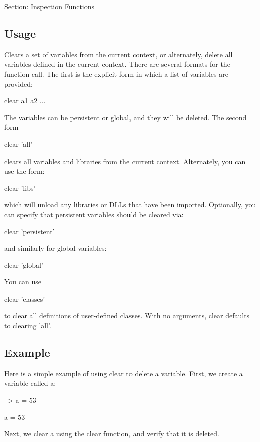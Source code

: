 Section\-: \hyperlink{sec_inspection}{Inspection Functions} \hypertarget{vtkwidgets_vtkxyplotwidget_Usage}{}\subsection{Usage}\label{vtkwidgets_vtkxyplotwidget_Usage}
Clears a set of variables from the current context, or alternately, delete all variables defined in the current context. There are several formats for the function call. The first is the explicit form in which a list of variables are provided\-: \begin{DoxyVerb}   clear a1 a2 ...
\end{DoxyVerb}
 The variables can be persistent or global, and they will be deleted. The second form \begin{DoxyVerb}   clear 'all'
\end{DoxyVerb}
 clears all variables and libraries from the current context. Alternately, you can use the form\-: \begin{DoxyVerb}   clear 'libs'
\end{DoxyVerb}
 which will unload any libraries or D\-L\-Ls that have been {\ttfamily import}ed. Optionally, you can specify that persistent variables should be cleared via\-: \begin{DoxyVerb}   clear 'persistent'
\end{DoxyVerb}
 and similarly for global variables\-: \begin{DoxyVerb}   clear 'global'
\end{DoxyVerb}
 You can use \begin{DoxyVerb}   clear 'classes'
\end{DoxyVerb}
 to clear all definitions of user-\/defined classes. With no arguments, {\ttfamily clear} defaults to clearing {\ttfamily 'all'}. \hypertarget{variables_struct_Example}{}\subsection{Example}\label{variables_struct_Example}
Here is a simple example of using {\ttfamily clear} to delete a variable. First, we create a variable called {\ttfamily a}\-:


\begin{DoxyVerbInclude}
--> a = 53

a = 
 53 
\end{DoxyVerbInclude}


Next, we clear {\ttfamily a} using the {\ttfamily clear} function, and verify that it is deleted.


